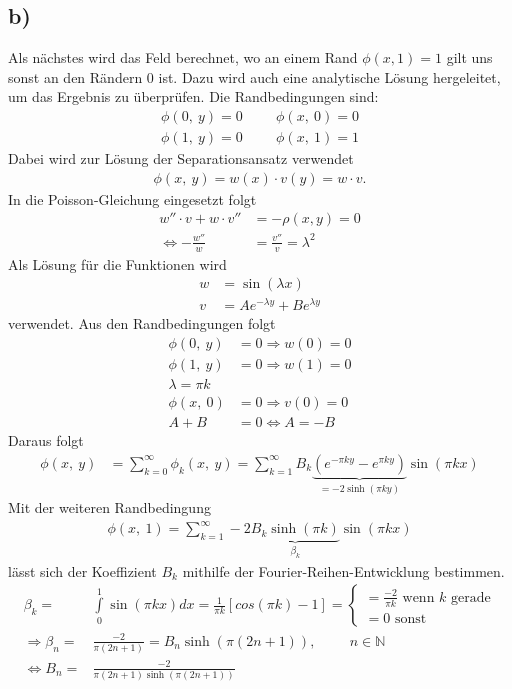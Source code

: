 \subsection*{b)}
Als nächstes wird das Feld berechnet, wo an einem Rand $\phi(x,1)=1$ gilt uns sonst an den Rändern 0 ist.
Dazu wird auch eine analytische Lösung hergeleitet, um das Ergebnis zu überprüfen.
Die Randbedingungen sind:
\begin{align}
	\phi(0,\ y)=0\hspace{1cm}\phi(x,\ 0)=0\\
	\phi(1,\ y)=0\hspace{1cm}\phi(x,\ 1)=1
\end{align}
Dabei wird zur Lösung der Separationsansatz verwendet 
\begin{align}
	\phi(x,\ y)=w(x)\cdot v(y)=w\cdot v.
\end{align}
In die Poisson-Gleichung eingesetzt folgt
\begin{align}
	w'' \cdot v + w\cdot v'' &= -\rho(x,y)=0\\
	\Leftrightarrow-\frac{w''}{w}&=\frac{v''}{v}=\lambda^2
\end{align}
Als Lösung für die Funktionen wird
\begin{align}
	w&=\sin(\lambda x)\label{eq:w}\\
	v&=Ae^{-\lambda y}+Be^{\lambda y}
\end{align}
verwendet.
Aus den Randbedingungen folgt
\begin{align}
	\phi(0,\ y)&=0\Rightarrow w(0)=0\\
	\phi(1,\ y)&=0\Rightarrow w(1)=0\\
	\lambda = \pi k\\
	\phi(x,\ 0)&=0\Rightarrow v(0)=0\\
	A+B&=0\Leftrightarrow A=-B
\end{align}
Daraus folgt 
\begin{align}
	\phi(x,\ y)&=\sum\limits_{k=0}^{\infty}\phi_k(x,\ y)=\sum\limits_{k=1}^{\infty}B_k\underbrace{\left( e^{-\pi ky }-e^{\pi k y} \right)}_{=-2\sinh(\pi k y)}\sin(\pi k x)
\end{align}
Mit der weiteren Randbedingung
\begin{align}
	\phi(x,\ 1)=\sum\limits_{k=1}^{\infty}-2\underbrace{ B_k\sinh(\pi k) }_{ \beta_k}\sin(\pi k x)
\end{align}
lässt sich der Koeffizient $B_k$ mithilfe der Fourier-Reihen-Entwicklung bestimmen.
\newpage
\begin{align}
	\beta_k=&\int\limits_{0}^{1}\sin(\pi k x)dx=\frac{1}{\pi k} [cos(\pi k) - 1]=
	\begin{cases}
		=\frac{-2}{\pi k}\text{ wenn }k\text{ gerade}\\
		=0 \text{ sonst}
	\end{cases}\\
	\Rightarrow
	\beta_n=&\frac{-2}{\pi (2n+1)}=B_n\sinh(\pi (2n+1)),\hspace{1cm}n\in\mathbb{N}\\
	\Leftrightarrow B_n=&\frac{-2}{\pi(2n+1)\sinh(\pi(2n+1))}
\end{align}
